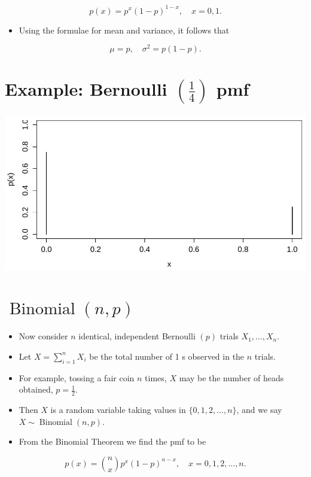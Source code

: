 \documentclass[10pt]{article}
\begin{document}
$$
p(x)=p^{x}(1-p)^{1-x}, \quad x=0,1 .
$$

\begin{itemize}
  \item Using the formulae for mean and variance, it follows that
\end{itemize}

$$
\mu=p, \quad \sigma^{2}=p(1-p) .
$$

\section*{Example: Bernoulli $\left(\frac{1}{4}\right)$ pmf}
\begin{center}
\includegraphics[max width=\textwidth]{2025_05_11_35704811148ad612caa6g-27}
\end{center}

\section*{$\operatorname{Binomial}(n, p)$}
\begin{itemize}
  \item Now consider $n$ identical, independent Bernoulli $(p)$ trials $X_{1}, \ldots, X_{n}$.
  \item Let $X=\sum_{i=1}^{n} X_{i}$ be the total number of 1 s observed in the $n$ trials.
  \item For example, tossing a fair coin $n$ times, $X$ may be the number of heads obtained, $p=\frac{1}{2}$.
  \item Then $X$ is a random variable taking values in $\{0,1,2, \ldots, n\}$, and we say $X \sim \operatorname{Binomial}(n, p)$.
  \item From the Binomial Theorem we find the pmf to be
\end{itemize}

$$
p(x)=\binom{n}{x} p^{x}(1-p)^{n-x}, \quad x=0,1,2, \ldots, n .
$$
\end{document}
